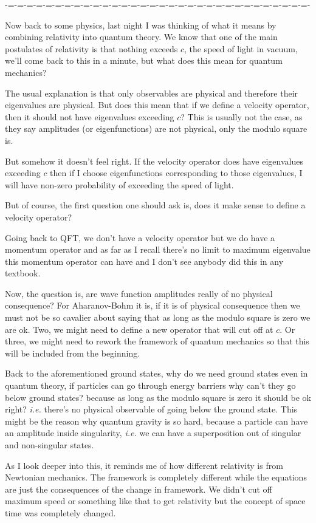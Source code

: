 \documentclass[aps,preprint,preprintnumbers,nofootinbib,showpacs,prd]{revtex4-1}
\newcommand{\ie}{{\it i.e.} }
\begin{document}
-=-=-=-=-=-=-=-=-=-=-=-=-=-=-=-=-=-=-=-=-=-=-=-=-=-=-=-=-=-=-=-=-

Now back to some physics, last night I was thinking of what it means by combining relativity into quantum theory. We know that one of the main postulates of relativity is that nothing exceeds $c$, the speed of light in vacuum, we'll come back to this in a minute, but what does this mean for quantum mechanics?

The usual explanation is that only observables are physical and therefore their eigenvalues are physical. But does this mean that if we define a velocity operator, then it should not have eigenvalues exceeding $c$? This is usually not the case, as they say amplitudes (or eigenfunctions) are not physical, only the modulo square is.

But somehow it doesn't feel right. If the velocity operator does have eigenvalues exceeding $c$ then if I choose eigenfunctions corresponding to those eigenvalues, I will have non-zero probability of exceeding the speed of light.

But of course, the first question one should ask is, does it make sense to define a velocity operator?

Going back to QFT, we don't have a velocity operator but we do have a momentum operator and as far as I recall there's no limit to maximum eigenvalue this momentum operator can have and I don't see anybody did this in any textbook.

Now, the question is, are wave function amplitudes really of no physical consequence? For Aharanov-Bohm it is, if it is of physical consequence then we must not be so cavalier about saying that as long as the modulo square is zero we are ok. Two, we might need to define a new operator that will cut off at $c$. Or three, we might need to rework the framework of quantum mechanics so that this will be included from the beginning.

Back to the aforementioned ground states, why do we need ground states even in quantum theory, if particles can go through energy barriers why can't they go below ground states? because as long as the modulo square is zero it should be ok right? \ie there's no physical observable of going below the ground state. This might be the reason why quantum gravity is so hard, because a particle can have an amplitude inside singularity, \ie we can have a superposition out of singular and non-singular states.

As I look deeper into this, it reminds me of how different relativity is from Newtonian mechanics. The framework is completely different while the equations are just the consequences of the change in framework. We didn't cut off maximum speed or something like that to get relativity but the concept of space time was completely changed.
\end{document}

